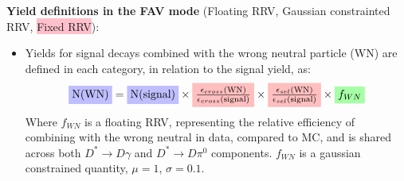 \documentclass[12pt, landscape]{article}
\begin{document}
\textbf{Yield definitions in the FAV mode} (\colorbox{blue!25}{Floating RRV},
\colorbox{green!35}{Gaussian constrainted RRV}, \colorbox{pink}{Fixed
RRV}):

\begin{itemize}
  \item Yields for signal decays combined with the wrong neutral particle (WN)
  are defined in each category, in relation to the signal yield, as:
  \begin{equation*}
    \colorbox{blue!25}{\text{N(WN)}} = \colorbox{blue!25}{\text{N(signal)}} \times
    \colorbox{pink}{$\frac{\epsilon_{cross}\text{(WN)}}{\epsilon_{cross}\text{(signal)}}$}
    \times
    \colorbox{pink}{$\frac{\epsilon_{sel}\text{(WN)}}{\epsilon_{sel}\text{(signal)}}$}
    \times 
    \colorbox{green!35}{$f_{WN}$}
  \end{equation*}
  Where $f_{WN}$ is a floating RRV, representing the relative efficiency of
  combining with the wrong neutral in data, compared to MC, and is shared across
  both $D^*\rightarrow D\gamma$ and $D^*\rightarrow D\pi^0$ components. $f_{WN}$
  is a gaussian constrained quantity, $\mu=1$, $\sigma=0.1$.


\end{itemize}
\end{document}
